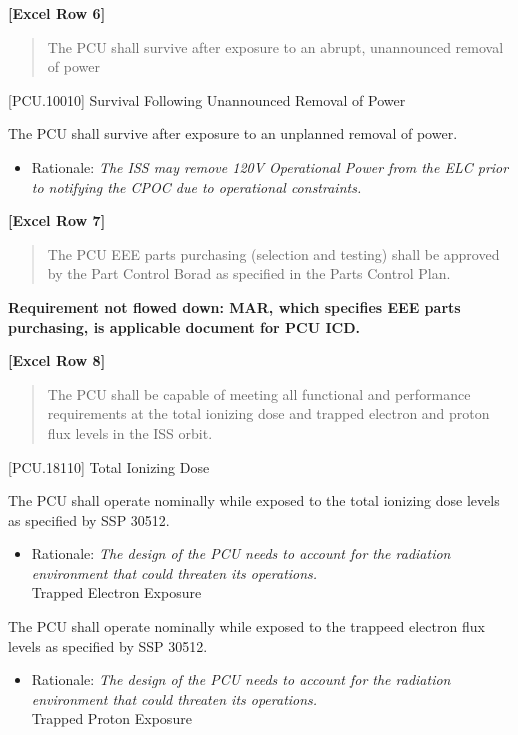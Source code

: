 \textbf{[Excel Row 6]}

\begin{quote}
The PCU shall survive after exposure to an abrupt, unannounced removal of power
\end{quote}

[PCU.10010] Survival Following Unannounced Removal of Power

The PCU shall survive after exposure to an unplanned removal of power.

\begin{itemize}
\item{} Rationale: \emph{The ISS may remove 120V Operational Power from the ELC prior to notifying the CPOC due to operational constraints.}

\end{itemize}

\textbf{[Excel Row 7]}

\begin{quote}
The PCU EEE parts purchasing (selection and testing) shall be approved by the Part Control Borad as specified in the Parts Control Plan.
\end{quote}

\textbf{Requirement not flowed down: MAR, which specifies EEE parts purchasing, is applicable document for PCU ICD.}

\textbf{[Excel Row 8]}

\begin{quote}
The PCU shall be capable of meeting all functional and performance requirements at the total ionizing dose and trapped electron and proton flux levels in the ISS orbit.
\end{quote}

[PCU.18110] Total Ionizing Dose

The PCU shall operate nominally while exposed to the total ionizing dose levels as specified by SSP 30512.

\begin{itemize}
\item{} Rationale: \emph{The design of the PCU needs to account for the radiation environment that could threaten its operations.}\\
[PCU.18115] Trapped Electron Exposure

\end{itemize}

The PCU shall operate nominally while exposed to the trappeed electron flux levels as specified by SSP 30512.

\begin{itemize}
\item{} Rationale: \emph{The design of the PCU needs to account for the radiation environment that could threaten its operations.}\\
[PCU.18120] Trapped Proton Exposure

\end{itemize}

